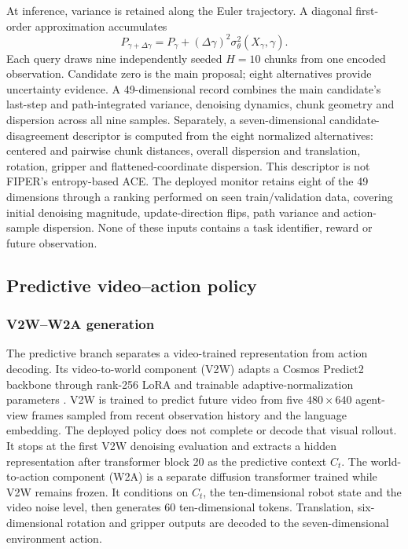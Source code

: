 At inference, variance is retained along the Euler trajectory. A diagonal
first-order approximation accumulates
\begin{equation}
  P_{\gamma+\Delta\gamma}
  =P_\gamma+(\Delta\gamma)^2\sigma_\theta^2(X_\gamma,\gamma).
  \label{eq:vla-path-variance}
\end{equation}
Each query draws nine independently seeded \(H=10\) chunks from one encoded
observation. Candidate zero is the main proposal; eight alternatives provide
uncertainty evidence. A 49-dimensional record combines the main candidate's
last-step and path-integrated variance, denoising dynamics, chunk geometry and
dispersion across all nine samples. Separately, a seven-dimensional candidate-
disagreement descriptor is computed from the eight normalized alternatives:
centered and pairwise chunk distances, overall dispersion and translation,
rotation, gripper and flattened-coordinate dispersion. This descriptor is not
FIPER's entropy-based ACE. The deployed monitor retains eight of the 49
dimensions through a ranking performed on seen train/validation data, covering
initial denoising magnitude, update-direction flips, path variance and action-
sample dispersion. None of these inputs contains a task identifier, reward or
future observation.

\subsection{Predictive video--action policy}

\subsubsection{V2W--W2A generation}

The predictive branch separates a video-trained representation from action
decoding. Its video-to-world component (V2W) adapts a Cosmos Predict2 backbone
through rank-256 LoRA and trainable adaptive-normalization parameters
\cite{lora,cosmospolicy}. V2W is trained to predict future video from five
\(480\times640\) agent-view frames sampled from recent observation history and
the language embedding. The deployed policy does not complete or decode that
visual rollout. It stops at the first V2W denoising evaluation and extracts a
hidden representation after transformer block 20 as the predictive context
\(C_t\). The world-to-action component (W2A) is a separate diffusion
transformer trained while V2W remains frozen. It conditions on \(C_t\), the
ten-dimensional robot state and the video noise level, then generates 60
ten-dimensional tokens. Translation, six-dimensional rotation and gripper
outputs are decoded to the seven-dimensional environment action.

